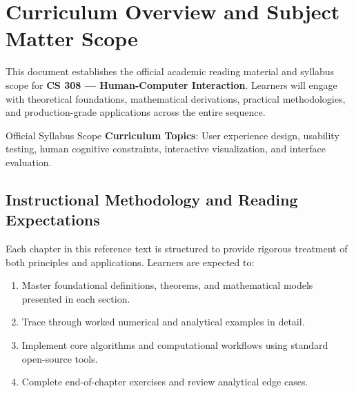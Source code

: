 \section{Curriculum Overview and Subject Matter Scope}

This document establishes the official academic reading material and syllabus scope for \textbf{CS 308 --- Human-Computer Interaction}. Learners will engage with theoretical foundations, mathematical derivations, practical methodologies, and production-grade applications across the entire sequence.

\begin{InsightBox}{Official Syllabus Scope}
  \textbf{Curriculum Topics}: User experience design, usability testing, human cognitive constraints, interactive visualization, and interface evaluation.
\end{InsightBox}

\subsection{Instructional Methodology and Reading Expectations}

Each chapter in this reference text is structured to provide rigorous treatment of both principles and applications. Learners are expected to:
\begin{enumerate}
  \item Master foundational definitions, theorems, and mathematical models presented in each section.
  \item Trace through worked numerical and analytical examples in detail.
  \item Implement core algorithms and computational workflows using standard open-source tools.
  \item Complete end-of-chapter exercises and review analytical edge cases.
\end{enumerate}

